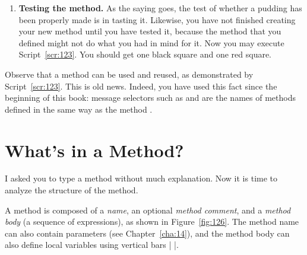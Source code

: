\documentclass[a4paper,10pt,twoside]{book}
\begin{document}
\begin{enumerate}
\item \textbf{Testing the method.} As the saying goes, the test of whether a pudding has been properly made is in tasting it. Likewise, you have not finished creating your new method 
until you have tested it, because the method that you defined might not do what you 
had in mind for it. Now you may execute Script~\ref{scr:123}. You should get one black square 
and one red square. 
\end{enumerate}

Observe that a method can be used and reused, as demonstrated by Script~\ref{scr:123}. This is 
old news. Indeed, you have used this fact since the beginning of this book: message selectors 
such as  and  are the names of methods defined in the same way as the method 
. 

\section{What’s in a Method?} 

I asked you to type a method without much explanation. Now it is time to analyze the structure of the method. 

A method is composed of a \emph{name}, an optional \emph{method comment}, and a \emph{method body} (a sequence of expressions), as shown in Figure~\ref{fig:126}. The method name can also contain parameters (see Chapter~\ref{cha:14}), and the method body can also define local variables using vertical bars | |. 
\end{document}
